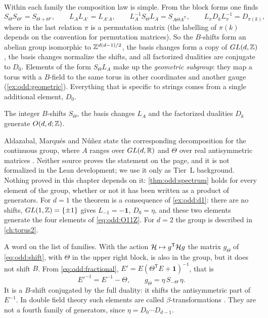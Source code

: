 Within each family the composition law is simple. From the block forms one finds
\begin{equation}\label{eq:odd:relations}
 S_\Theta S_{\Theta'}=S_{\Theta+\Theta'},\qquad L_AL_{A'}=L_{A'A},\qquad
 L_A^{-1}S_\Theta L_A=S_{A\Theta A^{\mathsf T}},\qquad
 L_\pi D_kL_\pi^{-1}=D_{\pi(k)},
\end{equation}
where in the last relation $\pi$ is a permutation matrix (the labelling of $\pi(k)$ depends
on the convention for permutation matrices). So the $B$-shifts form an abelian group
isomorphic to $\mathbb{Z}^{d(d-1)/2}$, the basis changes form a copy of $GL(d,\mathbb{Z})$, the basis
changes normalize the shifts, and all factorized dualities are conjugate to $D_0$.
Elements of the form $S_\Theta L_A$ make up the \emph{geometric
subgroup}: they map a torus with a $B$-field to the same torus
in other coordinates and another gauge (\cref{ex:odd:geometric}). Everything that is
specific to strings comes from a single additional element, $D_0$.

\begin{theorem}[Generation]\label{thm:odd:generation}
The integer $B$-shifts $S_\Theta$, the basis changes $L_A$ and the factorized dualities
$D_k$ generate $O(d,d;\mathbb{Z})$. \TL\ 
\end{theorem}
Aldazabal, Marqu\'es and N\'u\~nez state the corresponding decomposition for the continuous
group, where $A$ ranges over $GL(d,\mathbb{R})$ and $\Theta$ over real antisymmetric matrices
. Neither source proves the statement on the
page, and it is not formalized in the Lean development; we use it only as Tier~L
background. Nothing proved in this chapter depends on it: \cref{thm:odd:spectrum} holds for
every element of the group, whether or not it has been written as a product of generators.
For $d=1$ the theorem is a consequence of \cref{ex:odd:d1}: there are no shifts,
$GL(1,\mathbb{Z})=\{\pm1\}$ gives $L_{-1}=-\mathbf 1$, $D_0=\eta$, and these two elements generate
the four elements of \eqref{eq:odd:O11Z}. For $d=2$ the group is described in
\cref{ch:torus2}.

A word on the list of families. With the action $\mathcal{H}\mapsto g^{\mathsf T}\mathcal{H} g$ the matrix
$g_\Theta$ of \eqref{eq:odd:shift}, with $\Theta$ in the upper right block, is also in the
group, but it does not shift $B$. From \eqref{eq:odd:fractional},
$E'=E(\Theta^{\mathsf T}E+\mathbf 1)^{-1}$, that is
\begin{equation}\label{eq:odd:beta}
 E'^{-1}=E^{-1}-\Theta ,\qquad g_\Theta=\eta\,S_{-\Theta}\,\eta .
\end{equation}
It is a $B$-shift conjugated by the full duality: it shifts the antisymmetric part of
$E^{-1}$. In double field theory such elements are called
$\beta$-transformations . They are not a fourth family of generators, since $\eta=D_0\cdots D_{d-1}$.

